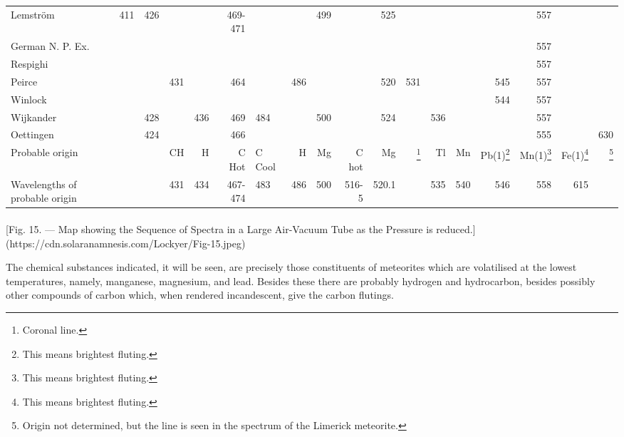 \documentclass[a4paper, 12pt, oneside, polutonikogreek, english]{article}
\begin{document}
\begin{landscape}
\begin{center}
\begin{longtable}{p{30mm} | r | r | r | r | r | p{15mm} | r | r | r | r | r | r | r | r | r | r | r |}
         Lemström                & 411 & 426 &     &     &  469-471  &           &     & 499 &      & 525 &     &     &     &      & 557 &      &     \\ 
         German N. P. Ex.            &     &     &     &     &       &           &     &     &      &      &     &     &     &      & 557 &      &     \\ 
         Respighi                &     &     &     &     &       &           &     &     &      &      &     &     &     &      & 557 &      &     \\ 
         Peirce                 &     &     & 431 &     & 464 &           & 486 &     &      & 520 & 531 &     &     & 545 & 557 &      &     \\ 
         Winlock                 &     &     &     &     &       &           &     &     &      &      &     &     &     & 544 & 557 &      &     \\ 
         Wijkander                &     & 428 &     & 436 & 469 & 484 &     & 500 &      & 524 &     & 536 &     &      & 557 &      &     \\ 
         Oettingen                &     & 424 &     &     & 466 &           &     &     &      &      &     &     &     &      & 555 &      & 630 \\ 
         Probable origin             &     &     &  CH  &  H   &  C Hot   &  C Cool       &  H   &  Mg  &  C hot  &  Mg   &  \footnote{Coronal line.}   &  Tl  &  Mn  &  Pb(1)\footnote{This means brightest fluting.}  &  Mn(1)\footnote{This means brightest fluting.}  &  Fe(1)\footnote{This means brightest fluting.}  &  \footnote{Origin not determined, but the line is seen in the spectrum of the Limerick meteorite.}   \\ 
         Wavelengths of probable origin     &     &     & 431 & 434 &  467-474  & 483 & 486 & 500 &  516-5  & 520.1 &     & 535 & 540 & 546 & 558 & 615 & ~ \\ 
    \end{longtable}
\end{center}
\end{landscape}
\clearpage
\paragraph{}
[Fig. 15. --- Map showing the Sequence of Spectra in a Large Air-Vacuum Tube as the Pressure is reduced.](https://cdn.solaranamnesis.com/Lockyer/Fig-15.jpeg)

The chemical substances indicated, it will be seen, are precisely those constituents of meteorites which are volatilised at the lowest temperatures, namely, manganese, magnesium, and lead. Besides these there are probably hydrogen and hydrocarbon, besides possibly other compounds of carbon which, when rendered incandescent, give the carbon flutings.
\end{document}

